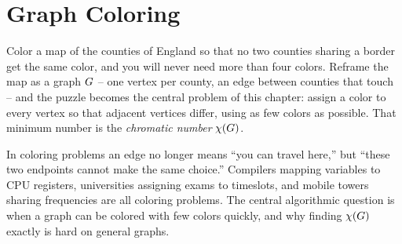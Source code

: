\chapter{Graph Coloring}

\providecommand{\degen}{\operatorname{degen}}

Color a map of the counties of
England so that no two counties sharing a border get the same color, and you will never
need more than four colors. Reframe the map as a graph $G$ -- one vertex per
county, an edge between counties that touch -- and the puzzle becomes the central problem
of this chapter: assign a color to every vertex so that adjacent vertices differ, using as
few colors as possible. That minimum number is the \emph{chromatic number} $\chi(G)$.

In coloring problems an edge no longer
means ``you can travel here,'' but ``these two endpoints cannot make the same choice.''
Compilers mapping variables to CPU registers, universities assigning exams to timeslots,
and mobile towers sharing frequencies are all coloring problems. The central algorithmic question is when a graph can be colored with few colors quickly, and why finding $\chi(G)$ exactly is hard on general graphs.

